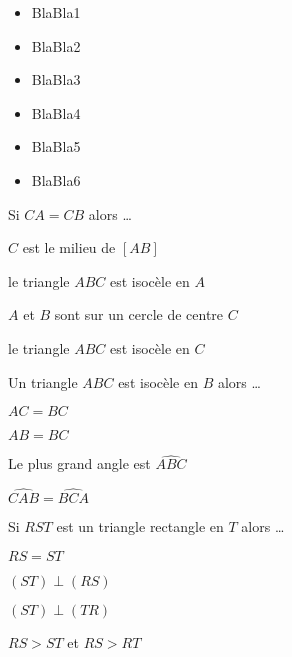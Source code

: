 \begin{acquis}
\begin{itemize}
\item BlaBla1
\item BlaBla2
\item BlaBla3
\item BlaBla4
\item BlaBla5
\item BlaBla6
\end{itemize}
\end{acquis}


\begin{QCM}
  \begin{GroupeQCM} 
    \begin{exercice}
      Si $CA = CB$ alors \ldots
      \begin{ChoixQCM}{4}
      \item $C$ est le milieu de $[AB]$
      \item le triangle $ABC$ est isocèle en $A$
      \item $A$ et $B$ sont sur un cercle de centre $C$
      \item le triangle $ABC$ est isocèle en $C$
      \end{ChoixQCM}
\begin{corrige}
   \end{corrige}
    \end{exercice}
    

    \begin{exercice}
      Un triangle $ABC$ est isocèle en $B$ alors \ldots
      \begin{ChoixQCM}{4}
      \item $AC = BC$
      \item $AB = BC$
      \item Le plus grand angle est $\widehat{ABC}$
      \item $\widehat{CAB} = \widehat{BCA}$
      \end{ChoixQCM}
\begin{corrige}
   \end{corrige}
    \end{exercice}


    \begin{exercice}
      Si $RST$ est un triangle rectangle en $T$ alors \ldots
      \begin{ChoixQCM}{4}
      \item $RS = ST$
      \item $(ST) \perp (RS)$
      \item $(ST) \perp (TR)$
      \item $RS > ST$ et $RS > RT$
      \end{ChoixQCM}
\begin{corrige}
   \end{corrige}
    \end{exercice}
    


\end{GroupeQCM}
\end{QCM}
